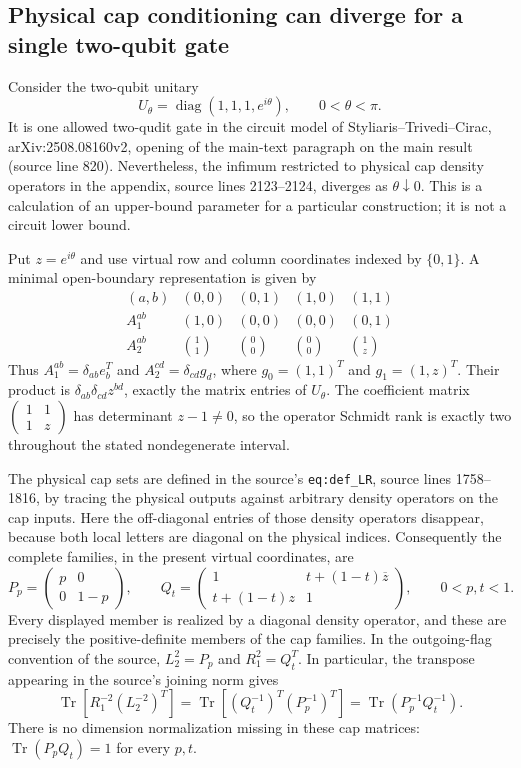 \documentclass[11pt]{article}
\begin{document}
\subsection*{Physical cap conditioning can diverge for a single two-qubit gate}

Consider the two-qubit unitary
\[
 U_\theta=\operatorname{diag}(1,1,1,e^{i\theta}),\qquad 0<\theta<\pi.
\]
It is one allowed two-qudit gate in the circuit model of
Styliaris--Trivedi--Cirac, arXiv:2508.08160v2, opening of the
main-text paragraph on the main result (source line 820).
Nevertheless, the infimum restricted to physical cap density operators
in the appendix, source lines 2123--2124, diverges as
$\theta\downarrow0$. This is a calculation of an upper-bound parameter
for a particular construction; it is not a circuit lower bound.

Put $z=e^{i\theta}$ and use virtual row and column coordinates indexed by
$\{0,1\}$. A minimal open-boundary representation is given by
\[
\begin{array}{c|cccc}
 (a,b)&(0,0)&(0,1)&(1,0)&(1,1)\\ \hline
 A_1^{ab}&(1,0)&(0,0)&(0,0)&(0,1)\\[2pt]
 A_2^{ab}&\binom{1}{1}&\binom{0}{0}&\binom{0}{0}&\binom{1}{z}
\end{array}
\]
Thus $A_1^{ab}=\delta_{ab}e_b^T$ and
$A_2^{cd}=\delta_{cd}g_d$, where
$g_0=(1,1)^T$ and $g_1=(1,z)^T$. Their product is
$\delta_{ab}\delta_{cd}z^{bd}$, exactly the matrix entries of $U_\theta$.
The coefficient matrix
$\left(\begin{smallmatrix}1&1\\1&z\end{smallmatrix}\right)$
has determinant $z-1\ne0$, so the operator Schmidt rank is exactly two
throughout the stated nondegenerate interval.

The physical cap sets are defined in the source's
\nolinkurl{eq:def_LR}, source lines 1758--1816, by tracing the
physical outputs against arbitrary density operators on the cap inputs.
Here the off-diagonal entries of those density operators disappear,
because both local letters are diagonal on the physical indices.
Consequently the complete families, in the present virtual coordinates,
are
\[
 P_p=\begin{pmatrix}p&0\\0&1-p\end{pmatrix},\qquad
 Q_t=\begin{pmatrix}
 1&t+(1-t)\overline z\\t+(1-t)z&1
 \end{pmatrix},\qquad 0<p,t<1.
\]
Every displayed member is realized by a diagonal density operator, and
these are precisely the positive-definite members of the cap families.
In the outgoing-flag convention of the source,
$L_2^2=P_p$ and $R_1^2=Q_t^T$. In particular, the transpose appearing
in the source's joining norm gives
\[
 \operatorname{Tr}\!\left[R_1^{-2}(L_2^{-2})^T\right]
 =\operatorname{Tr}\!\left[(Q_t^{-1})^T(P_p^{-1})^T\right]
 =\operatorname{Tr}(P_p^{-1}Q_t^{-1}).
\]
There is no dimension normalization missing in these cap matrices:
$\operatorname{Tr}(P_pQ_t)=1$ for every $p,t$.
\end{document}

